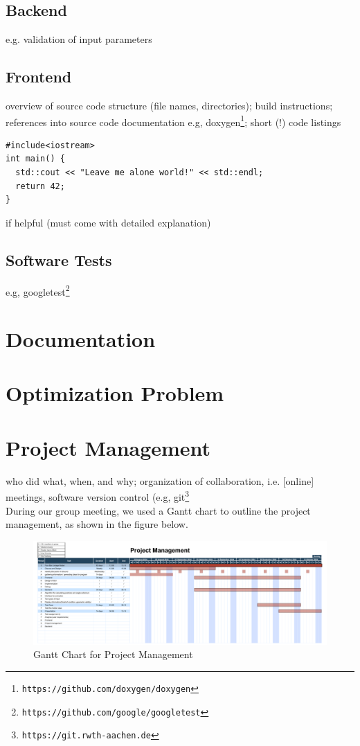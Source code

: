 \documentclass{article}
\begin{document}
\subsection{Backend}
e.g. validation of input parameters

\subsection{Frontend}

overview of source code structure (file names, directories); build instructions; references into source code documentation e.g, doxygen\footnote{\tt https://github.com/doxygen/doxygen}; short (!) code listings
\begin{lstlisting}
#include<iostream>
int main() {
  std::cout << "Leave me alone world!" << std::endl;
  return 42;
}
\end{lstlisting}
if helpful (must come with detailed explanation)

\subsection{Software Tests}

e.g, googletest\footnote{\tt https://github.com/google/googletest}

\section{Documentation}\label{ch:doc}

\section{Optimization Problem}\label{ch:optimization-problem}

\section{Project Management} \label{ch:projectmanagement}

who did what, when, and why; organization of collaboration, i.e. [online] meetings, software version control (e.g, git\footnote{\tt https://git.rwth-aachen.de}\\

During our group meeting, we used a Gantt chart to outline the project management, as shown in the figure below.  

\begin{figure}[h]
	\centering
	\includegraphics[width=\textwidth]{./figures/project_management_gantt_chart.pdf}
	\caption{Gantt Chart for Project Management}
	\label{fig:project_management_gantt_chart}
\end{figure}
\end{document}
